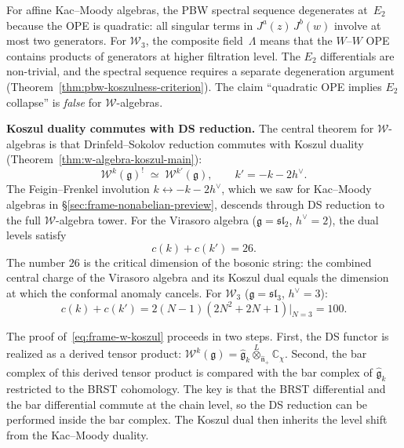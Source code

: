 \begin{remark}
\label{rem:frame-pbw-warning}
For affine Kac--Moody algebras, the PBW spectral sequence degenerates
at~$E_2$ because the OPE is quadratic: all singular terms in
$J^a(z)\,J^b(w)$ involve at most two generators.  For $\mathcal{W}_3$,
the composite field~$\Lambda$ means that the $W$--$W$ OPE contains
products of generators at higher filtration level.  The $E_2$
differentials are non-trivial, and the spectral sequence requires
a separate degeneration argument
(Theorem~\ref{thm:pbw-koszulness-criterion}).  The claim ``quadratic
OPE implies $E_2$ collapse'' is \emph{false} for $\mathcal{W}$-algebras.
\end{remark}

\medskip
\noindent\textbf{Koszul duality commutes with DS reduction.}
The central theorem for $\mathcal{W}$-algebras is that Drinfeld--Sokolov
reduction commutes with Koszul duality
(Theorem~\ref{thm:w-algebra-koszul-main}):
\begin{equation}\label{eq:frame-w-koszul}
\mathcal{W}^k(\mathfrak{g})^!
\;\simeq\;
\mathcal{W}^{k'}(\mathfrak{g}),
\qquad
k' = -k - 2h^\vee.
\end{equation}
The Feigin--Frenkel involution $k \leftrightarrow -k - 2h^\vee$,
which we saw for Kac--Moody algebras in
\S\ref{sec:frame-nonabelian-preview}, descends through DS reduction
to the full $\mathcal{W}$-algebra tower.  For the Virasoro algebra
($\mathfrak{g} = \mathfrak{sl}_2$, $h^\vee = 2$), the dual levels
satisfy
\begin{equation}\label{eq:frame-virasoro-dual-central-charge}
c(k) + c(k') = 26.
\end{equation}
The number $26$ is the critical dimension of the bosonic string:
the combined central charge of the Virasoro algebra and its Koszul
dual equals the dimension at which the conformal anomaly cancels.
For $\mathcal{W}_3$ ($\mathfrak{g} = \mathfrak{sl}_3$,
$h^\vee = 3$):
\begin{equation}\label{eq:frame-w3-dual-central-charge}
c(k) + c(k') = 2(N{-}1)(2N^2{+}2N{+}1)\big|_{N=3} = 100.
\end{equation}

The proof of~\eqref{eq:frame-w-koszul} proceeds in two steps.
First, the DS functor is realized as a derived tensor product:
$\mathcal{W}^k(\mathfrak{g}) = \widehat{\mathfrak{g}}_k
\overset{L}{\otimes}_{\widehat{\mathfrak{n}}_+} \mathbb{C}_\chi$.
Second, the bar complex of this derived tensor product is compared
with the bar complex of $\widehat{\mathfrak{g}}_k$ restricted to
the BRST cohomology.  The key is that the BRST differential and the
bar differential commute at the chain level, so the DS reduction
can be performed inside the bar complex.  The Koszul dual then
inherits the level shift from the Kac--Moody duality.

